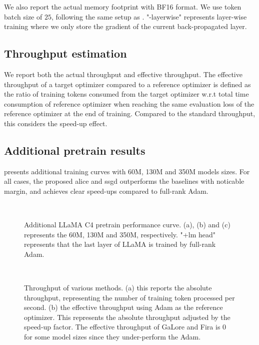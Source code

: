 We also report the actual memory footprint with BF16 format. We use token batch size of $25$, following the same setup as \cite{zhao2024galore}. "-layerwise" represents layer-wise training where we only store the gradient of the current back-propagated layer. 

\subsection{Throughput estimation}
\label{subapp: exp details throughput}
We report both the actual throughput and effective throughput. The effective throughput of a target optimizer compared to a reference optimizer is defined as the ratio of training tokens consumed from the target optimizer w.r.t total time consumption of reference optimizer when reaching the same evaluation loss of the reference optimizer at the end of training. Compared to the standard throughput, this considers the speed-up effect. 

\subsection{Additional pretrain results}
\label{subapp: additional pretrain results}
 presents additional training curves with 60M, 130M and 350M models sizes. For all cases, the proposed \gls{alice} and \gls{ssgd} outperforms the baselines with noticable margin, and achieves clear speed-ups compared to full-rank Adam.
\begin{figure}
\hfill
{}\\
\centering
{}
\caption{Additional LLaMA C4 pretrain performance curve. (a), (b) and (c) represents the 60M, 130M and 350M, respectively. "+lm head" represents that the last layer of LLaMA is trained by full-rank Adam.}
    \label{fig: additional pretrain curve}
\end{figure}

\begin{figure}
\centering
{}\\
\caption{Throughput of various methods. (a) this reports the absolute throughput, representing the number of training token processed per second. (b) the effective throughput using Adam as the reference optimizer. This represents the absolute throughput adjusted by the speed-up factor. The effective throughput of GaLore and Fira is $0$ for some model sizes since they under-perform the Adam. }
    \label{fig: throughput plot}
\end{figure}

